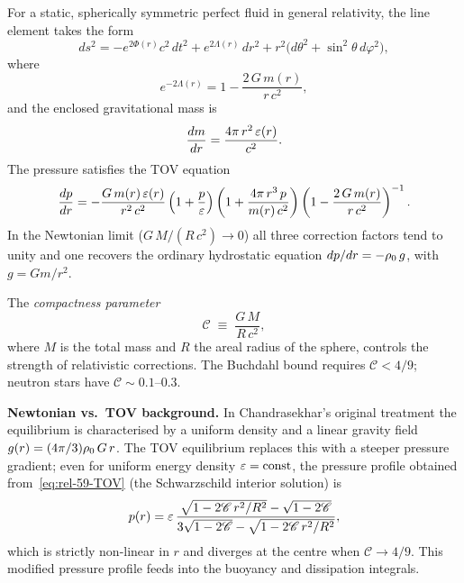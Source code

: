 For a static, spherically symmetric perfect fluid in general relativity,
the line element takes the form
\begin{equation}
\label{eq:rel-59-metric}
ds^{2} = -e^{2\Phi(r)}c^{2}\,dt^{2}
  + e^{2\Lambda(r)}\,dr^{2}
  + r^{2}\bigl(d\theta^{2}+\sin^{2}\!\theta\,d\varphi^{2}\bigr),
\end{equation}
where
\begin{equation}
\label{eq:rel-59-Lambda}
e^{-2\Lambda(r)} = 1 - \frac{2\,G\,m(r)}{r\,c^{2}},
\end{equation}
and the enclosed gravitational mass is
\begin{equation}
\label{eq:rel-59-mass}
\frac{dm}{dr} = \frac{4\pi\,r^{2}\,\varepsilon(r)}{c^{2}}.
\end{equation}
The pressure satisfies the TOV equation
\begin{equation}
\label{eq:rel-59-TOV}
\frac{dp}{dr} =
  -\frac{G\,m(r)\,\varepsilon(r)}{r^{2}\,c^{2}}
  \left(1 + \frac{p}{\varepsilon}\right)
  \left(1 + \frac{4\pi\,r^{3}\,p}{m(r)\,c^{2}}\right)
  \left(1 - \frac{2\,G\,m(r)}{r\,c^{2}}\right)^{-1}.
\end{equation}
In the Newtonian limit ($G\,M/(R\,c^{2})\to 0$) all three correction
factors tend to unity and one recovers the ordinary hydrostatic equation
$dp/dr = -\rho_0\,g$, with $g = Gm/r^{2}$.

The \emph{compactness parameter}
\begin{equation}
\label{eq:rel-59-compactness}
\mathscr{C} \;\equiv\; \frac{G\,M}{R\,c^{2}},
\end{equation}
where $M$ is the total mass and $R$ the areal radius of the sphere,
controls the strength of relativistic corrections.  The Buchdahl bound
requires $\mathscr{C} < 4/9$; neutron stars have $\mathscr{C}\sim
0.1$--$0.3$.

\begin{relcorrection}
\textbf{Newtonian vs.\ TOV background.}
In Chandrasekhar's original treatment the equilibrium is
characterised by a uniform density and a linear gravity field
$g(r) = (4\pi/3)\rho_0\,G\,r$.  The TOV equilibrium replaces
this with a steeper pressure gradient; even for uniform energy
density $\varepsilon = \text{const}$, the pressure profile obtained
from~\eqref{eq:rel-59-TOV} (the Schwarzschild interior solution)
is
\begin{equation}
\label{eq:rel-59-Schwint}
p(r) = \varepsilon\,
  \frac{\sqrt{1-2\mathscr{C}\,r^{2}/R^{2}}
        - \sqrt{1-2\mathscr{C}}}
       {3\sqrt{1-2\mathscr{C}}
        - \sqrt{1-2\mathscr{C}\,r^{2}/R^{2}}},
\end{equation}
which is strictly non-linear in $r$ and diverges at the centre when
$\mathscr{C}\to 4/9$.  This modified pressure profile feeds into the
buoyancy and dissipation integrals.
\end{relcorrection}

